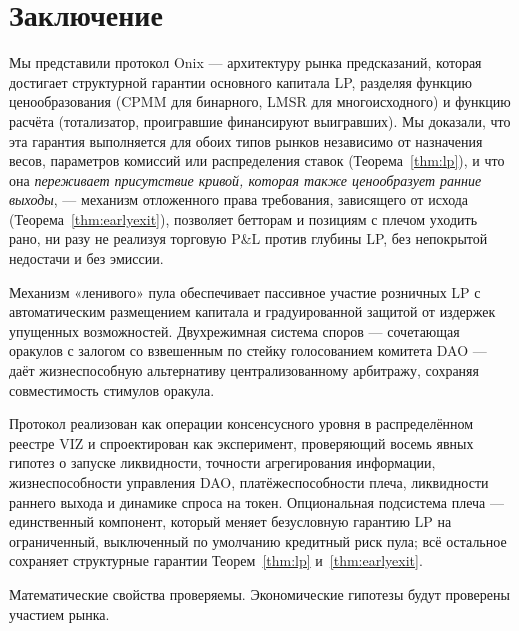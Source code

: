 \documentclass{ledger}
\theoremstyle{plain}
\theoremstyle{remark}
\begin{document}
\section{Заключение}\label{sec:conclusion}

Мы представили протокол Onix --- архитектуру рынка предсказаний, которая достигает
структурной гарантии основного капитала LP, разделяя функцию ценообразования (CPMM
для бинарного, LMSR для многоисходного) и функцию расчёта (тотализатор, проигравшие
финансируют выигравших). Мы доказали, что эта гарантия выполняется для обоих типов
рынков независимо от назначения весов, параметров комиссий или распределения ставок
(Теорема~\ref{thm:lp}), и что она \emph{переживает присутствие кривой, которая также
ценообразует ранние выходы}, --- механизм отложенного права требования, зависящего от
исхода (Теорема~\ref{thm:earlyexit}), позволяет бетторам и позициям с плечом уходить
рано, ни разу не реализуя торговую P\&L против глубины LP, без непокрытой недостачи и
без эмиссии.

Механизм «ленивого» пула обеспечивает пассивное участие розничных LP с автоматическим
размещением капитала и градуированной защитой от издержек упущенных возможностей.
Двухрежимная система споров --- сочетающая оракулов с залогом со взвешенным по стейку
голосованием комитета DAO --- даёт жизнеспособную альтернативу централизованному
арбитражу, сохраняя совместимость стимулов оракула.

Протокол реализован как операции консенсусного уровня в распределённом реестре VIZ и
спроектирован как эксперимент, проверяющий восемь явных гипотез о запуске
ликвидности, точности агрегирования информации, жизнеспособности управления DAO,
платёжеспособности плеча, ликвидности раннего выхода и динамике спроса на токен.
Опциональная подсистема плеча --- единственный компонент, который меняет безусловную
гарантию LP на ограниченный, выключенный по умолчанию кредитный риск пула; всё
остальное сохраняет структурные гарантии Теорем~\ref{thm:lp}
и~\ref{thm:earlyexit}.

Математические свойства проверяемы. Экономические гипотезы будут проверены участием
рынка.
\end{document}
